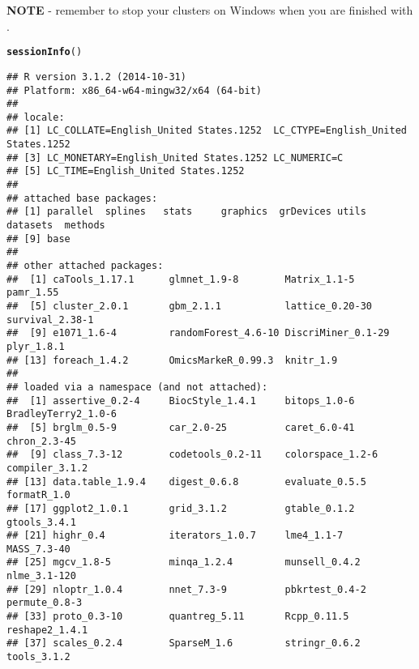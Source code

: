 \documentclass[12pt]{article}\usepackage[]{graphicx}\usepackage[usenames,dvipsnames]{color}
\makeatletter
\newcommand{\hlstd}[1]{\textcolor[rgb]{0.345,0.345,0.345}{#1}}%
\newcommand{\hlkwd}[1]{\textcolor[rgb]{0.737,0.353,0.396}{\textbf{#1}}}%
\newenvironment{kframe}{%
 \def\at@end@of@kframe{}%
 \ifinner\ifhmode%
  \def\at@end@of@kframe{\end{minipage}}%
  \begin{minipage}{\columnwidth}%
 \fi\fi%
 \def\FrameCommand##1{\hskip\@totalleftmargin \hskip-\fboxsep
 \colorbox{shadecolor}{##1}\hskip-\fboxsep
     \hskip-\linewidth \hskip-\@totalleftmargin \hskip\columnwidth}%
 \MakeFramed {\advance\hsize-\width
   \@totalleftmargin\z@ \linewidth\hsize
   \@setminipage}}%
 {\par\unskip\endMakeFramed%
 \at@end@of@kframe}
\newenvironment{knitrout}{}{} %
\makeatother
\begin{document}
\textbf{NOTE} - remember to stop your clusters on Windows when you are finished 
with .

\newpage
\begin{knitrout}
\color{fgcolor}\begin{kframe}
\begin{alltt}
\hlkwd{sessionInfo}\hlstd{()}
\end{alltt}
\begin{verbatim}
## R version 3.1.2 (2014-10-31)
## Platform: x86_64-w64-mingw32/x64 (64-bit)
## 
## locale:
## [1] LC_COLLATE=English_United States.1252  LC_CTYPE=English_United States.1252   
## [3] LC_MONETARY=English_United States.1252 LC_NUMERIC=C                          
## [5] LC_TIME=English_United States.1252    
## 
## attached base packages:
## [1] parallel  splines   stats     graphics  grDevices utils     datasets  methods  
## [9] base     
## 
## other attached packages:
##  [1] caTools_1.17.1      glmnet_1.9-8        Matrix_1.1-5        pamr_1.55          
##  [5] cluster_2.0.1       gbm_2.1.1           lattice_0.20-30     survival_2.38-1    
##  [9] e1071_1.6-4         randomForest_4.6-10 DiscriMiner_0.1-29  plyr_1.8.1         
## [13] foreach_1.4.2       OmicsMarkeR_0.99.3  knitr_1.9          
## 
## loaded via a namespace (and not attached):
##  [1] assertive_0.2-4     BiocStyle_1.4.1     bitops_1.0-6        BradleyTerry2_1.0-6
##  [5] brglm_0.5-9         car_2.0-25          caret_6.0-41        chron_2.3-45       
##  [9] class_7.3-12        codetools_0.2-11    colorspace_1.2-6    compiler_3.1.2     
## [13] data.table_1.9.4    digest_0.6.8        evaluate_0.5.5      formatR_1.0        
## [17] ggplot2_1.0.1       grid_3.1.2          gtable_0.1.2        gtools_3.4.1       
## [21] highr_0.4           iterators_1.0.7     lme4_1.1-7          MASS_7.3-40        
## [25] mgcv_1.8-5          minqa_1.2.4         munsell_0.4.2       nlme_3.1-120       
## [29] nloptr_1.0.4        nnet_7.3-9          pbkrtest_0.4-2      permute_0.8-3      
## [33] proto_0.3-10        quantreg_5.11       Rcpp_0.11.5         reshape2_1.4.1     
## [37] scales_0.2.4        SparseM_1.6         stringr_0.6.2       tools_3.1.2
\end{verbatim}
\end{kframe}
\end{knitrout}
\end{document}
